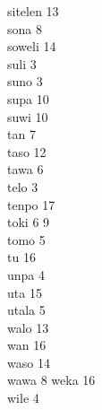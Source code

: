 sitelen 13 \\
sona 8 \\
soweli 14 \\
suli 3 \\
suno 3 \\
supa 10 \\
suwi 10 \\
tan 7 \\
taso 12 \\
tawa 6 \\
telo 3 \\
tenpo 17 \\
toki 6 9 \\
tomo 5 \\
tu 16 \\
unpa 4 \\
uta 15 \\
utala 5 \\
walo 13 \\
wan 16 \\
waso 14 \\
wawa 8
weka 16 \\
wile 4 \\